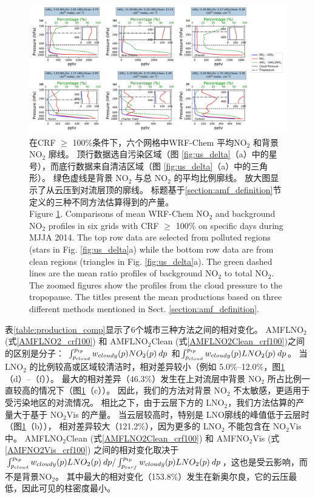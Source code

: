 \begin{figure}[htbp]
\includegraphics[width=18cm]{./figures/us_bkgd_comp.pdf}
\caption{在CRF $\geq$ 100\%条件下，六个网格中WRF-Chem 平均NO$_\textrm{2}$ 和背景 NO$_\textrm{2}$ 廓线。
顶行数据选自污染区域（图 \ref{fig:us_delta}（a）中的星号），而底行数据来自清洁区域（图 \ref{fig:us_delta}（a）中的三角形）。
绿色虚线是背景 NO$_\textrm{2}$ 与总 NO$_\textrm{2}$ 的平均比例廓线。
放大图显示了从云压到对流层顶的廓线。
标题基于\ref{section:amf_definition}节定义的三种不同方法估算得到的产量。\\
Figure \ref{fig:us_bkgd_comp}. Comparisons of mean WRF-Chem NO$_\textrm{2}$ and background NO$_\textrm{2}$ profiles in six grids with CRF $\geq$ 100\% on specific days during MJJA 2014.
The top row data are selected from polluted regions (stars in Fig. \ref{fig:us_delta}a) while the bottom row data are from clean regions (triangles in Fig. \ref{fig:us_delta}a).
The green dashed lines are the mean ratio profiles of background NO$_\textrm{2}$ to total NO$_\textrm{2}$.
The zoomed figures show the profiles from the cloud pressure to the tropopause.
The titles present the mean productions based on three different methods mentioned in Sect. \ref{section:amf_definition}.}
\label{fig:us_bkgd_comp}
\end{figure}


表\ref{table:production_comp}显示了6个城市三种方法之间的相对变化。
AMFLNO$_2$ (式\ref{AMFLNO2_crf100}) 和 AMFLNO$_2$Clean (式\ref{AMFLNO2Clean_crf100})之间的区别是分子：
$\int_{p_{\textrm cloud}}^{p_{\textrm tp}} w_{\textrm cloudy}(p) NO_2(p) \: dp$
和$\int_{p_{\textrm cloud}}^{p_{\textrm tp}} w_{\textrm cloudy}(p) LNO_2(p) \: dp$。
当 LNO$_2$ 的比例较高或区域较清洁时，相对差异较小（例如 5.0\%--12.0\%，图\ref{fig:us_bkgd_comp}（d）--（f））。
最大的相对差异（46.3\%）发生在上对流层中背景 NO$_2$ 所占比例一直较高的情况下（图\ref{fig:us_bkgd_comp}（c））。
因此，我们的方法对背景 NO$_2$ 不太敏感，更适用于受污染地区的对流情况。
相比之下，由于云层下方的 LNO$_2$，我们方法估算的产量大于基于 NO$_2$Vis 的产量。
当云层较高时，特别是 LNO廓线的峰值低于云层时（图\ref{fig:us_bkgd_comp}（b）），
相对差异较大（121.2\%），因为更多的 LNO$_2$ 不能包含在 NO$_2$Vis 中。
AMFLNO$_2$Clean (式\ref{AMFLNO2Clean_crf100}) 和 AMFNO$_2$Vis (式\ref{AMFNO2Vis_crf100}) 之间的相对变化取决于
$\int_{p_{\textrm cloud}}^{p_{\textrm tp}} w_{\textrm cloudy}(p) LNO_2(p) \: dp / \int_{p_{\textrm surf}}^{p_{\textrm tp}} w_{\textrm cloudy}(p) LNO_2(p) \: dp$，这也是受云影响，而不是背景NO$_2$。
其中最大的相对变化（153.8\%）发生在新奥尔良，它的云压最低，因此可见的柱密度最小。

